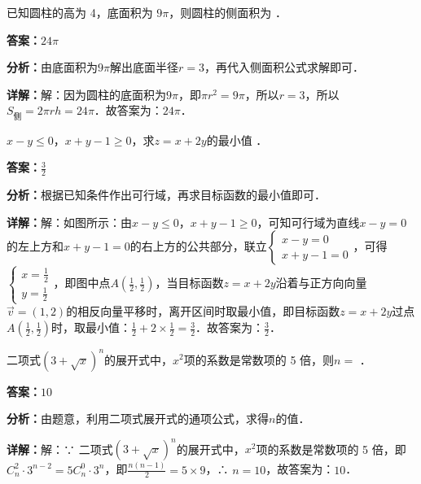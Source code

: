 \begin{question}[points=4]
已知圆柱的高为 4，底面积为 $9\pi$，则圆柱的侧面积为 ．
\fillin[{$24\pi$}]
\begin{solution}
\textbf{答案：}$24\pi$

\textbf{分析：}由底面积为$9\pi$解出底面半径$r=3$，再代入侧面积公式求解即可．

\textbf{详解：}解：因为圆柱的底面积为$9\pi$，即$\pi r^2 =9\pi$，所以$r=3$，所以$S_{\text{侧}}=2\pi rh=24\pi$．故答案为：$24\pi$．
\end{solution}
\end{question}

\begin{question}[points=4]
$x-y\leq 0$，$x+y-1\geq 0$，求$z=x+2y$的最小值 ．
\fillin[{$\frac{3}{2}$}]
\begin{solution}
\textbf{答案：}$\frac{3}{2}$

\textbf{分析：}根据已知条件作出可行域，再求目标函数的最小值即可．

\textbf{详解：}解：如图所示：由$x-y\leq 0$，$x+y-1\geq 0$，可知可行域为直线$x-y=0$的左上方和$x+y-1=0$的右上方的公共部分，联立$\begin{cases}x-y=0\\x+y-1=0\end{cases}$，可得$\begin{cases}x=\frac{1}{2}\\y=\frac{1}{2}\end{cases}$，即图中点$A\left(\frac{1}{2},\frac{1}{2}\right)$，当目标函数$z=x+2y$沿着与正方向向量$\vec{v}=(1,2)$的相反向量平移时，离开区间时取最小值，即目标函数$z=x+2y$过点$A\left(\frac{1}{2},\frac{1}{2}\right)$时，取最小值：$\frac{1}{2}+2\times\frac{1}{2}=\frac{3}{2}$．故答案为：$\frac{3}{2}$．
\end{solution}
\end{question}

\begin{question}[points=4]
二项式$(3+\sqrt{x})^n$的展开式中，$x^2$项的系数是常数项的 5 倍，则$n=$ ．
\fillin[{$10$}]
\begin{solution}
\textbf{答案：}$10$

\textbf{分析：}由题意，利用二项式展开式的通项公式，求得$n$的值．

\textbf{详解：}解：∵ 二项式$(3+\sqrt{x})^n$的展开式中，$x^2$项的系数是常数项的 5 倍，即$C_n^2\cdot 3^{n-2}=5C_n^0\cdot 3^n$，即$\frac{n(n-1)}{2}=5\times9$，∴ $n=10$，故答案为：$10$．
\end{solution}
\end{question}

